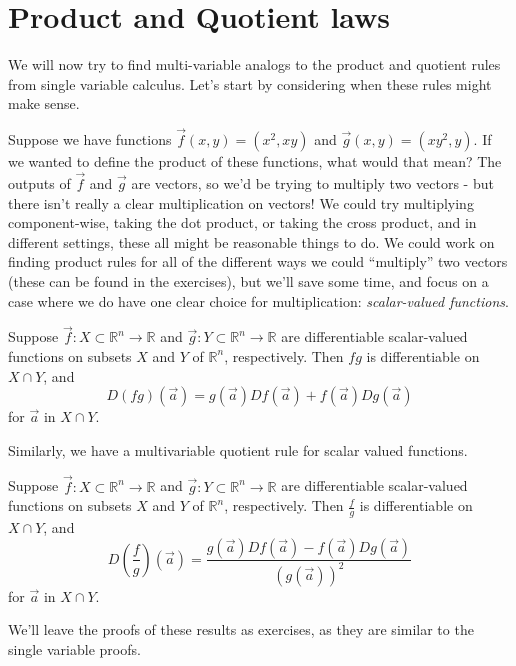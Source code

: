 \documentclass{ximera}
\begin{document}
\section*{Product and Quotient laws}

We will now try to find multi-variable analogs to the product and quotient rules from single variable calculus. Let's start by considering when these rules might make sense.

Suppose we have functions $\vec{f}(x,y) = (x^2,xy)$ and $\vec{g}(x,y) = (xy^2, y)$. If we wanted to define the product of these functions, what would that mean? The outputs of $\vec{f}$ and $\vec{g}$ are vectors, so we'd be trying to multiply two vectors - but there isn't really a clear multiplication on vectors! We could try multiplying component-wise, taking the dot product, or taking the cross product, and in different settings, these all might be reasonable things to do. We could work on finding product rules for all of the different ways we could ``multiply'' two vectors (these can be found in the exercises), but we'll save some time, and focus on a case where we do have one clear choice for multiplication: \emph{scalar-valued functions}.

\begin{proposition}
Suppose $\vec{f}:X\subset \mathbb{R}^n\rightarrow \mathbb{R}$ and $\vec{g}:Y\subset\mathbb{R}^n\rightarrow\mathbb{R}$ are differentiable scalar-valued functions on subsets $X$ and $Y$ of $\mathbb{R}^n$, respectively. Then $fg$ is differentiable on $X\cap Y$, and \[D(fg)(\vec{a})=g(\vec{a})Df(\vec{a})+f(\vec{a})Dg(\vec{a})\] for $\vec{a}$ in $X\cap Y$.
\end{proposition}

Similarly, we have a multivariable quotient rule for scalar valued functions.

\begin{proposition}
Suppose $\vec{f}:X\subset \mathbb{R}^n\rightarrow \mathbb{R}$ and $\vec{g}:Y\subset\mathbb{R}^n\rightarrow\mathbb{R}$ are differentiable scalar-valued functions on subsets $X$ and $Y$ of $\mathbb{R}^n$, respectively. Then $\frac{f}{g}$ is differentiable on $X\cap Y$, and \[D\left(\frac{f}{g}\right)(\vec{a})=\frac{g(\vec{a})Df(\vec{a})-f(\vec{a})Dg(\vec{a})}{(g(\vec{a}))^2}\] for $\vec{a}$ in $X\cap Y$.
\end{proposition}

We'll leave the proofs of these results as exercises, as they are similar to the single variable proofs.
\end{document}
